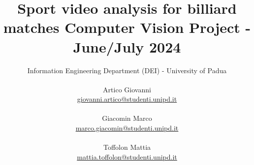 \documentclass{article}
\title{\huge \textbf{Sport video analysis for billiard matches} \newline \Large Computer Vision Project - June/July 2024
}
\author{Information Engineering Department (DEI) - University of Padua \\ \\
        Artico Giovanni \\ \href{mailto:giovanni.artico@studenti.unipd.it}{giovanni.artico@studenti.unipd.it} \\ \\
        Giacomin Marco \\  \href{mailto:marco.giacomin@studenti.unipd.it}{marco.giacomin@studenti.unipd.it} \\ \\
        Toffolon Mattia \\ \href{mailto:mattia.toffolon@studenti.unipd.it}{mattia.toffolon@studenti.unipd.it} 
}
\date{}
\begin{document}
\maketitle
\vspace{10mm}
\tableofcontents
\thispagestyle{empty}

\newpage
{}














\label{sec:performance}











\end{document}
